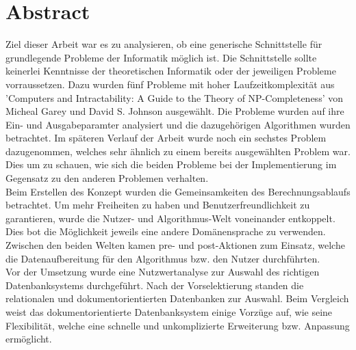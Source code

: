 %
%

\thispagestyle{empty}


\newpage
\thispagestyle{empty}
\chapter*{Abstract}\label{abstract}
Ziel dieser Arbeit war es zu analysieren, ob eine generische Schnittstelle für grundlegende Probleme der Informatik möglich ist. Die Schnittstelle sollte keinerlei Kenntnisse 
der theoretischen Informatik oder der jeweiligen Probleme vorraussetzen. Dazu wurden fünf Probleme mit hoher Laufzeitkomplexität aus 'Computers and Intractability: A Guide to the Theory of 
NP-Completeness' von Micheal Garey und David S. Johnson ausgewählt.  Die Probleme wurden auf ihre Ein- und Ausgabeparamter analysiert und die dazugehörigen 
Algorithmen wurden betrachtet. Im späteren Verlauf der Arbeit wurde noch ein sechstes Problem dazugenommen, welches sehr ähnlich zu einem bereits ausgewählten Problem war. Dies 
um zu schauen, wie sich die beiden Probleme bei der Implementierung im Gegensatz zu den anderen Problemen verhalten.\\

Beim Erstellen des Konzept wurden die Gemeinsamkeiten des Berechnungsablaufs betrachtet. Um mehr Freiheiten zu haben und Benutzerfreundlichkeit zu garantieren, wurde die Nutzer- und 
Algorithmus-Welt voneinander entkoppelt. Dies bot die Möglichkeit jeweils eine andere Domänensprache zu verwenden. Zwischen den beiden Welten kamen pre- und post-Aktionen zum Einsatz, 
welche die Datenaufbereitung für den Algorithmus bzw. den Nutzer durchführten.\\

Vor der Umsetzung wurde eine Nutzwertanalyse zur Auswahl des richtigen Datenbanksystems durchgeführt. Nach der Vorselektierung standen die relationalen und dokumentorientierten 
Datenbanken zur Auswahl. Beim Vergleich weist das dokumentorientierte Datenbanksystem einige Vorzüge auf, wie seine Flexibilität, welche eine schnelle und unkomplizierte Erweiterung bzw. 
Anpassung ermöglicht.\\


